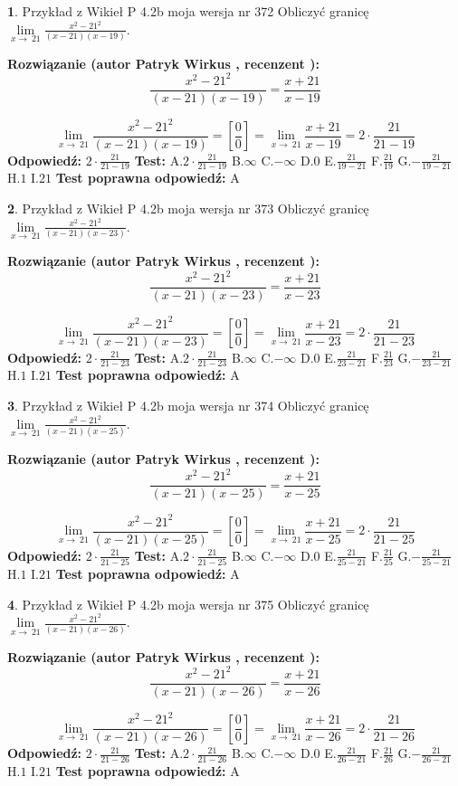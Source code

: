 \documentclass[12pt, a4paper]{article}
\theoremstyle{definition} %
\newtheorem{zad}{}
\newcommand{\zadStart}[1]{\begin{zad}#1\newline}
\newcommand{\zadStop}{\end{zad}}
\newcommand{\rozwStart}[2]{\noindent \textbf{Rozwiązanie (autor #1 , recenzent #2): }\newline}
\newcommand{\rozwStop}{\newline}
\newcommand{\odpStart}{\noindent \textbf{Odpowiedź:}\newline}
\newcommand{\odpStop}{\newline}
\newcommand{\testStart}{\noindent \textbf{Test:}\newline}
\newcommand{\testStop}{\newline}
\newcommand{\kluczStart}{\noindent \textbf{Test poprawna odpowiedź:}\newline}
\newcommand{\kluczStop}{\newline}
\begin{document}
\zadStart{Przykład z Wikieł P 4.2b moja wersja nr 372}
Obliczyć granicę $\lim\limits_{x\to\ 21}\frac{x^{2}-21^{2}}{(x-21)(x-19)}$.
\zadStop
\rozwStart{Patryk Wirkus}{}
$$\frac{x^{2}-21^{2}}{(x-21)(x-19)}=\frac{x+21}{x-19}$$

$$\lim\limits_{x\to\ 21}\frac{x^{2}-21^{2}}{(x-21)(x-19)}=[\frac{0}{0}]=\lim\limits_{x\to\ 21}\frac{x+21}{x-19}=2 \cdot \frac{21}{21-19}$$
\rozwStop
\odpStart
$2 \cdot \frac{21}{21-19}$
\odpStop
\testStart
A.$2 \cdot \frac{21}{21-19}$
B.$\infty$
C.$-\infty$
D.$0$
E.$\frac{21}{19-21}$
F.$\frac{21}{19}$
G.$-\frac{21}{19-21}$
H.$1$
I.$21$
\testStop
\kluczStart
A
\kluczStop



\zadStart{Przykład z Wikieł P 4.2b moja wersja nr 373}
Obliczyć granicę $\lim\limits_{x\to\ 21}\frac{x^{2}-21^{2}}{(x-21)(x-23)}$.
\zadStop
\rozwStart{Patryk Wirkus}{}
$$\frac{x^{2}-21^{2}}{(x-21)(x-23)}=\frac{x+21}{x-23}$$

$$\lim\limits_{x\to\ 21}\frac{x^{2}-21^{2}}{(x-21)(x-23)}=[\frac{0}{0}]=\lim\limits_{x\to\ 21}\frac{x+21}{x-23}=2 \cdot \frac{21}{21-23}$$
\rozwStop
\odpStart
$2 \cdot \frac{21}{21-23}$
\odpStop
\testStart
A.$2 \cdot \frac{21}{21-23}$
B.$\infty$
C.$-\infty$
D.$0$
E.$\frac{21}{23-21}$
F.$\frac{21}{23}$
G.$-\frac{21}{23-21}$
H.$1$
I.$21$
\testStop
\kluczStart
A
\kluczStop



\zadStart{Przykład z Wikieł P 4.2b moja wersja nr 374}
Obliczyć granicę $\lim\limits_{x\to\ 21}\frac{x^{2}-21^{2}}{(x-21)(x-25)}$.
\zadStop
\rozwStart{Patryk Wirkus}{}
$$\frac{x^{2}-21^{2}}{(x-21)(x-25)}=\frac{x+21}{x-25}$$

$$\lim\limits_{x\to\ 21}\frac{x^{2}-21^{2}}{(x-21)(x-25)}=[\frac{0}{0}]=\lim\limits_{x\to\ 21}\frac{x+21}{x-25}=2 \cdot \frac{21}{21-25}$$
\rozwStop
\odpStart
$2 \cdot \frac{21}{21-25}$
\odpStop
\testStart
A.$2 \cdot \frac{21}{21-25}$
B.$\infty$
C.$-\infty$
D.$0$
E.$\frac{21}{25-21}$
F.$\frac{21}{25}$
G.$-\frac{21}{25-21}$
H.$1$
I.$21$
\testStop
\kluczStart
A
\kluczStop



\zadStart{Przykład z Wikieł P 4.2b moja wersja nr 375}
Obliczyć granicę $\lim\limits_{x\to\ 21}\frac{x^{2}-21^{2}}{(x-21)(x-26)}$.
\zadStop
\rozwStart{Patryk Wirkus}{}
$$\frac{x^{2}-21^{2}}{(x-21)(x-26)}=\frac{x+21}{x-26}$$

$$\lim\limits_{x\to\ 21}\frac{x^{2}-21^{2}}{(x-21)(x-26)}=[\frac{0}{0}]=\lim\limits_{x\to\ 21}\frac{x+21}{x-26}=2 \cdot \frac{21}{21-26}$$
\rozwStop
\odpStart
$2 \cdot \frac{21}{21-26}$
\odpStop
\testStart
A.$2 \cdot \frac{21}{21-26}$
B.$\infty$
C.$-\infty$
D.$0$
E.$\frac{21}{26-21}$
F.$\frac{21}{26}$
G.$-\frac{21}{26-21}$
H.$1$
I.$21$
\testStop
\kluczStart
A
\kluczStop
\end{document}
